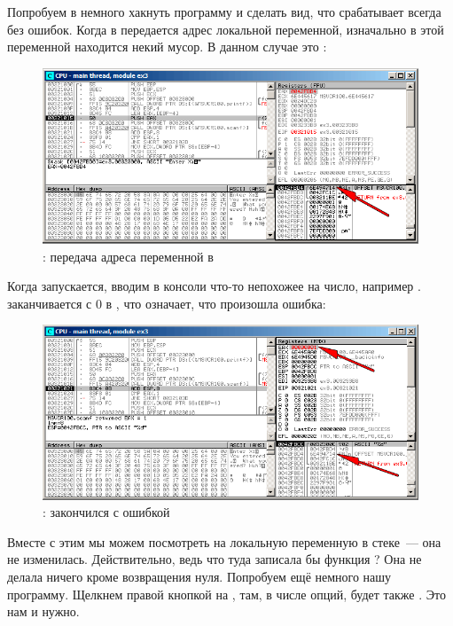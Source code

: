 \clearpage
{}

Попробуем в \olly немного хакнуть программу и сделать вид, что \scanf срабатывает всегда без ошибок.
Когда в \scanf передается адрес локальной переменной, изначально в этой переменной
находится некий мусор. В данном случае это :

\begin{figure}[H]
\centering
\includegraphics[scale=\FigScale]{patterns/04_scanf/3_checking_retval/olly_1.png}
\caption{\olly: передача адреса переменной в \scanf}
\label{fig:scanf_ex3_olly_1}
\end{figure}

\clearpage
Когда \scanf запускается, вводим в консоли что-то непохожее на число, например .
\scanf заканчивается с 0 в \EAX, что означает, что произошла ошибка:

\begin{figure}[H]
\centering
\includegraphics[scale=\FigScale]{patterns/04_scanf/3_checking_retval/olly_2.png}
\caption{\olly: \scanf закончился с ошибкой}
\label{fig:scanf_ex3_olly_2}
\end{figure}

Вместе с этим мы можем посмотреть на локальную переменную в стеке~--- она не изменилась.
Действительно, ведь что туда записала бы функция \scanf?
Она не делала ничего кроме возвращения нуля.
Попробуем ещё немного  нашу программу.
Щелкнем правой кнопкой на \EAX, там, в числе опций, будет также .
Это нам и нужно.


